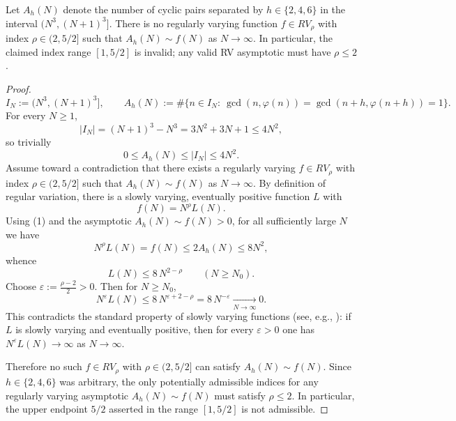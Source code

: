 \begin{theorem}\label{thm:asymptotic_k_fold_cyclics_between_cubes}
Let $A_h(N)$ denote the number of cyclic pairs separated by $h\in\{2,4,6\}$ in the interval $(N^3,(N+1)^3]$. There is no regularly varying function $f\in RV_\rho$ with index $\rho\in(2,5/2]$ such that $A_h(N)\sim f(N)$ as $N\to\infty$. In particular, the claimed index range $[1,5/2]$ is invalid; any valid RV asymptotic must have $\rho\le 2$.
\end{theorem}

\begin{proof}
$$
I_N:=(N^3,(N+1)^3],\qquad A_h(N):=\#\{n\in I_N:\ \gcd(n,\varphi(n))=\gcd(n+h,\varphi(n+h))=1\}.
$$
For every $N\ge 1$,
$$
|I_N|=(N+1)^3-N^3=3N^2+3N+1\le 4N^2,
$$
so trivially
$$
0\le A_h(N)\le |I_N|\le 4N^2. \tag{1}
$$
Assume toward a contradiction that there exists a regularly varying $f\in RV_\rho$ with index $\rho\in(2,5/2]$ such that $A_h(N)\sim f(N)$ as $N\to\infty$. By definition of regular variation, there is a slowly varying, eventually positive function $L$ with
$$
f(N)=N^{\rho}L(N). \tag{2}
$$
Using (1) and the asymptotic $A_h(N)\sim f(N)>0$, for all sufficiently large $N$ we have
$$
N^{\rho}L(N)=f(N)\le 2A_h(N)\le 8N^2,
$$
whence
$$
L(N)\le 8\,N^{2-\rho}\qquad(N\ge N_0). \tag{3}
$$
Choose $\varepsilon:=\tfrac{\rho-2}{2}>0$. Then for $N\ge N_0$,
$$
N^{\varepsilon}L(N)\le 8\,N^{\varepsilon+2-\rho}=8\,N^{-\varepsilon}\xrightarrow[N\to\infty]{}0. \tag{4}
$$
This contradicts the standard property of slowly varying functions (see, e.g., \cite{BGT1989}): if $L$ is slowly varying and eventually positive, then for every $\varepsilon>0$ one has $N^{\varepsilon}L(N)\to\infty$ as $N\to\infty$.

Therefore no such $f\in RV_\rho$ with $\rho\in(2,5/2]$ can satisfy $A_h(N)\sim f(N)$. Since $h\in\{2,4,6\}$ was arbitrary, the only potentially admissible indices for any regularly varying asymptotic $A_h(N)\sim f(N)$ must satisfy $\rho\le 2$. In particular, the upper endpoint $5/2$ asserted in the range $[1,5/2]$ is not admissible. 
\end{proof}
